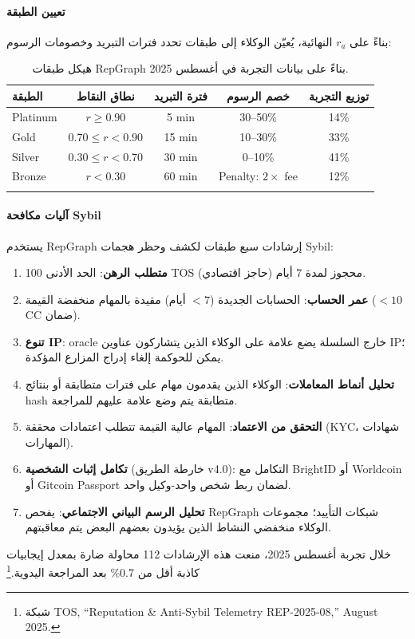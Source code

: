 \documentclass[11pt]{article}
\begin{document}
\paragraph{تعيين الطبقة} بناءً على $r_a$ النهائية، يُعيّن الوكلاء إلى طبقات تحدد فترات التبريد وخصومات الرسوم:
\begin{longtable}{@{}lcccc@{}}
\toprule
\textbf{الطبقة} & \textbf{نطاق النقاط} & \textbf{فترة التبريد} & \textbf{خصم الرسوم} & \textbf{توزيع التجربة} \\\midrule
Platinum & $r \geq 0.90$ & 5 min & 30--50\% & 14\% \\
Gold & $0.70 \leq r < 0.90$ & 15 min & 10--30\% & 33\% \\
Silver & $0.30 \leq r < 0.70$ & 30 min & 0--10\% & 41\% \\
Bronze & $r < 0.30$ & 60 min & Penalty: $2 \times$ fee & 12\% \\\bottomrule
\caption{هيكل طبقات RepGraph بناءً على بيانات التجربة في أغسطس 2025.}
\label{tab:reputation-tiers}
\end{longtable}

\paragraph{آليات مكافحة Sybil} يستخدم RepGraph إرشادات سبع طبقات لكشف وحظر هجمات Sybil:
\begin{enumerate}[noitemsep]
  \item \textbf{متطلب الرهن}: الحد الأدنى 100 TOS محجوز لمدة 7 أيام (حاجز اقتصادي).
  \item \textbf{عمر الحساب}: الحسابات الجديدة ($<7$ أيام) مقيدة بالمهام منخفضة القيمة ($<10$ CC ضمان).
  \item \textbf{تنوع IP}: oracle خارج السلسلة يضع علامة على الوكلاء الذين يتشاركون عناوين IP؛ يمكن للحوكمة إلغاء إدراج المزارع المؤكدة.
  \item \textbf{تحليل أنماط المعاملات}: الوكلاء الذين يقدمون مهام على فترات متطابقة أو بنتائج hash متطابقة يتم وضع علامة عليهم للمراجعة.
  \item \textbf{التحقق من الاعتماد}: المهام عالية القيمة تتطلب اعتمادات محققة (KYC، شهادات المهارات).
  \item \textbf{تكامل إثبات الشخصية} (خارطة الطريق v4.0): التكامل مع BrightID أو Worldcoin أو Gitcoin Passport لضمان ربط شخص واحد-وكيل واحد.
  \item \textbf{تحليل الرسم البياني الاجتماعي}: يفحص RepGraph شبكات التأييد؛ مجموعات الوكلاء منخفضي النشاط الذين يؤيدون بعضهم البعض يتم معاقبتهم.
\end{enumerate}
خلال تجربة أغسطس 2025، منعت هذه الإرشادات 112 محاولة ضارة بمعدل إيجابيات كاذبة أقل من 0.7\% بعد المراجعة اليدوية.\footnote{شبكة TOS, ``Reputation \& Anti-Sybil Telemetry REP-2025-08,'' August 2025.}
\end{document}
